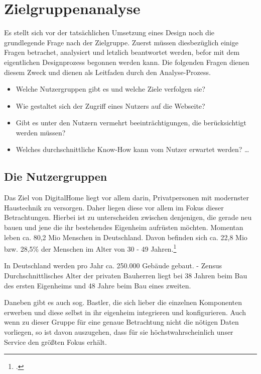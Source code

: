 \section{Zielgruppenanalyse}
Es stellt sich vor der tatsächlichen Umsetzung eines Design noch die grundlegende Frage nach der Zielgruppe. Zuerst müssen diesbezüglich einige Fragen betrachet, analysiert und letzlich beantwortet werden, befor mit dem eigentlichen Designprozess begonnen werden kann. Die folgenden Fragen dienen diesem Zweck und dienen als Leitfaden durch den Analyse-Prozess.
\begin{itemize}
	\item Welche Nutzergruppen gibt es und welche Ziele verfolgen sie?
	\item Wie gestaltet sich der Zugriff eines Nutzers auf die Webseite?
	\item Gibt es unter den Nutzern vermehrt beeinträchtigungen, die berücksichtigt werden müssen?
	\item Welches durchschnittliche Know-How kann vom Nutzer erwartet werden? \ldots
\end{itemize}
\subsection{Die Nutzergruppen}
Das Ziel von DigitalHome liegt vor allem darin, Privatpersonen mit modernster Haustechnik zu versorgen. Daher liegen diese vor allem im Fokus dieser Betrachtungen. Hierbei ist zu unterscheiden zwischen denjenigen, die gerade neu bauen und jene die ihr bestehendes Eigenheim aufrüsten möchten.
Momentan leben ca. 80,2 Mio Menschen in Deutschland. Davon befinden sich ca. 22,8 Mio bzw. 28,5\% der Menschen im Alter von 30 - 49 Jahren.\footcite[vgl.][]{zensus2011:alter}

In Deutschland werden pro Jahr ca. 250.000 Gebäude gebaut. - Zensus
Durchschnittlisches Alter der privaten Bauherren liegt bei 38 Jahren beim Bau des ersten Eigenheims und 48 Jahre beim Bau eines zweiten.

Daneben gibt es auch sog. Bastler, die sich lieber die einzelnen Komponenten erwerben und diese selbst in ihr eigenheim integrieren und konfigurieren. Auch wenn zu dieser Gruppe für eine genaue Betrachtung nicht die nötigen Daten vorliegen, so ist davon auszugehen, dass für sie höchstwahrscheinlich unser Service den größten Fokus erhält.